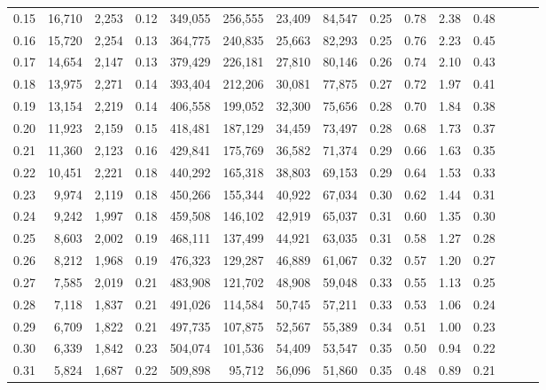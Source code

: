 \begin{tabular}{rrrrrrrrrrrrrrr}
0.15 &  16,710 &  2,253 &  0.12 &  349,055 &  256,555 &   23,409 &   84,547 &  0.25 &  0.78 &  2.38 &      0.48 \\
0.16 &  15,720 &  2,254 &  0.13 &  364,775 &  240,835 &   25,663 &   82,293 &  0.25 &  0.76 &  2.23 &      0.45 \\
0.17 &  14,654 &  2,147 &  0.13 &  379,429 &  226,181 &   27,810 &   80,146 &  0.26 &  0.74 &  2.10 &      0.43 \\
0.18 &  13,975 &  2,271 &  0.14 &  393,404 &  212,206 &   30,081 &   77,875 &  0.27 &  0.72 &  1.97 &      0.41 \\
0.19 &  13,154 &  2,219 &  0.14 &  406,558 &  199,052 &   32,300 &   75,656 &  0.28 &  0.70 &  1.84 &      0.38 \\
0.20 &  11,923 &  2,159 &  0.15 &  418,481 &  187,129 &   34,459 &   73,497 &  0.28 &  0.68 &  1.73 &      0.37 \\
0.21 &  11,360 &  2,123 &  0.16 &  429,841 &  175,769 &   36,582 &   71,374 &  0.29 &  0.66 &  1.63 &      0.35 \\
0.22 &  10,451 &  2,221 &  0.18 &  440,292 &  165,318 &   38,803 &   69,153 &  0.29 &  0.64 &  1.53 &      0.33 \\
0.23 &   9,974 &  2,119 &  0.18 &  450,266 &  155,344 &   40,922 &   67,034 &  0.30 &  0.62 &  1.44 &      0.31 \\
0.24 &   9,242 &  1,997 &  0.18 &  459,508 &  146,102 &   42,919 &   65,037 &  0.31 &  0.60 &  1.35 &      0.30 \\
0.25 &   8,603 &  2,002 &  0.19 &  468,111 &  137,499 &   44,921 &   63,035 &  0.31 &  0.58 &  1.27 &      0.28 \\
0.26 &   8,212 &  1,968 &  0.19 &  476,323 &  129,287 &   46,889 &   61,067 &  0.32 &  0.57 &  1.20 &      0.27 \\
0.27 &   7,585 &  2,019 &  0.21 &  483,908 &  121,702 &   48,908 &   59,048 &  0.33 &  0.55 &  1.13 &      0.25 \\
0.28 &   7,118 &  1,837 &  0.21 &  491,026 &  114,584 &   50,745 &   57,211 &  0.33 &  0.53 &  1.06 &      0.24 \\
0.29 &   6,709 &  1,822 &  0.21 &  497,735 &  107,875 &   52,567 &   55,389 &  0.34 &  0.51 &  1.00 &      0.23 \\
0.30 &   6,339 &  1,842 &  0.23 &  504,074 &  101,536 &   54,409 &   53,547 &  0.35 &  0.50 &  0.94 &      0.22 \\
0.31 &   5,824 &  1,687 &  0.22 &  509,898 &   95,712 &   56,096 &   51,860 &  0.35 &  0.48 &  0.89 &      0.21 \\

\end{tabular}
